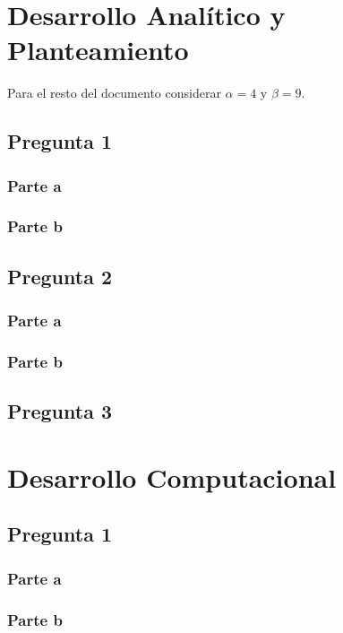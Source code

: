 \documentclass[12pt,letterpaper]{article}
\begin{document}


\section{Desarrollo Analítico y Planteamiento}
Para el resto del documento considerar $\alpha=4$ y $\beta=9$.
\subsection{Pregunta 1}
\subsubsection{Parte a}

\subsubsection{Parte b}

\subsection{Pregunta 2}
\subsubsection{Parte a}


\subsubsection{Parte b}

\subsection{Pregunta 3}


\section{Desarrollo Computacional}
\subsection{Pregunta 1}
\subsubsection{Parte a}

\subsubsection{Parte b}
\end{document}
